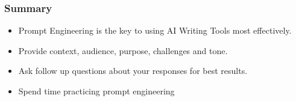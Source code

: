 \begin{frame}[fragile]\frametitle{Summary}

\begin{itemize}
\item Prompt Engineering is the key to using AI Writing Tools most
effectively.
\item Provide context, audience, purpose, challenges and tone.
\item Ask follow up questions about your responses for best results.
\item Spend time practicing prompt engineering
\end{itemize}	 

\end{frame}